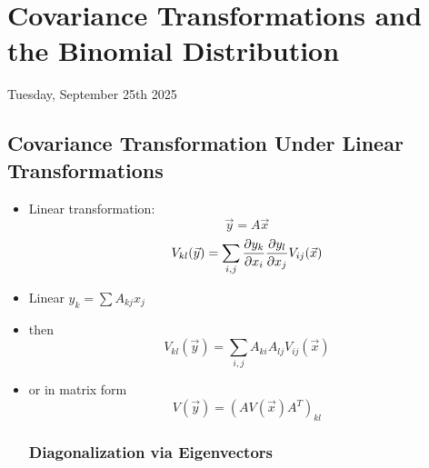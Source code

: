\section{Covariance Transformations and the Binomial Distribution}

Tuesday, September 25th 2025

\subsection{Covariance Transformation Under Linear Transformations}

\begin{itemize}
    \item Linear transformation:
          \[ \vec{y} = A\vec{x} \]
          \[ V_{kl}(\vec{y}) = \sum_{i,j} \pdv{y_k}{x_i} \pdv{y_l}{x_j} V_{ij}(\vec{x}) \]
    \item Linear $y_k = \sum A_{kj} x_j$
    \item then
          \[ V_{kl}(\vec{y}) = \sum_{i,j} A_{ki} A_{lj} V_{ij}(\vec{x}) \]
    \item or in matrix form
          \[ V(\vec{y}) = \left(A V(\vec{x}) A^T\right)_{kl} \]

          \subsubsection*{Diagonalization via Eigenvectors}


\end{itemize}
